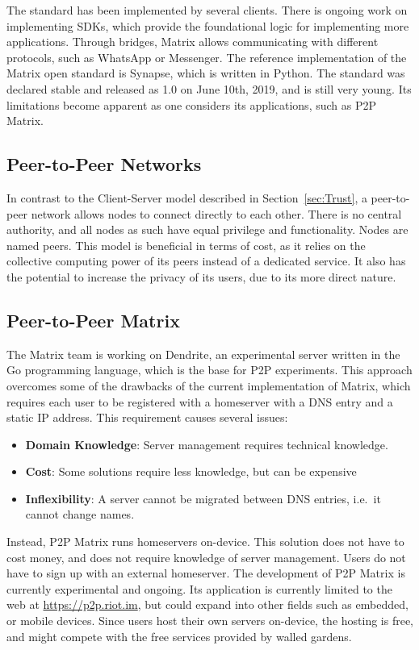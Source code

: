 The standard has been implemented by several clients\cite{matrix_org_clients}.
There is ongoing work on implementing SDKs\cite{matrix_org_sdks}, which provide the foundational logic for implementing more applications.
Through bridges, Matrix allows communicating with different protocols\cite{matrix_org_bridges}, such as WhatsApp or Messenger.
The reference implementation of the Matrix open standard is Synapse\cite{matrix_org_synapse}, which is written in Python.
The standard was declared stable and released as 1.0 on June 10th, 2019\cite{matrix_org_spec}, and is still very young.
Its limitations become apparent as one considers its applications, such as \ac{P2P} Matrix.

\subsection{Peer-to-Peer Networks}
In contrast to the Client-Server model described in Section~\ref{sec:Trust}, a peer-to-peer network allows nodes to connect directly to each other.
There is no central authority, and all nodes as such have equal privilege and functionality.
Nodes are named peers.
This model is beneficial in terms of cost, as it relies on the collective computing power of its peers instead of a dedicated service.
It also has the potential to increase the privacy of its users, due to its more direct nature.


\subsection{Peer-to-Peer Matrix}
The Matrix team is working on Dendrite\cite{matrix_org_dendrite}, an experimental server written in the Go programming language, which is the base for \ac{P2P} experiments.
This approach overcomes some of the drawbacks of the current implementation of Matrix, which requires each user to be registered with a homeserver with a \ac{DNS} entry and a static IP address.
This requirement causes several issues:
\begin{itemize}
	\item{
	      \textbf{Domain Knowledge}:
	      Server management requires technical knowledge.
	      }
	\item{
	      \textbf{Cost}:
	      Some solutions require less knowledge, but can be expensive     }
	\item{
	      \textbf{Inflexibility}:
	      A server cannot be migrated between \ac{DNS} entries, i.e.~it cannot change names.
	      }
\end{itemize}
Instead, \ac{P2P} Matrix runs homeservers on-device.
This solution does not have to cost money, and does not require knowledge of server management.
Users do not have to sign up with an external homeserver.
The development of \ac{P2P} Matrix is currently experimental and ongoing.
Its application is currently limited to the web at \url{https://p2p.riot.im}, but could expand into other fields such as embedded, or mobile devices.
Since users host their own servers on-device, the hosting is free, and might compete with the free services provided by walled gardens.

